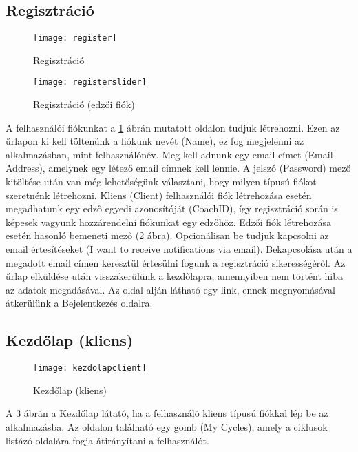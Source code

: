 \subsection{Regisztráció}

\begin{figure}[H]
	\centering
	\texttt{[image: register]}
	\caption{Regisztráció}
	\label{fig:register}
\end{figure}

\begin{figure}[H]
	\centering
	\texttt{[image: registerslider]}
	\caption{Regisztráció (edzői fiók)}
	\label{fig:registerslider}
\end{figure}

A felhasználói fiókunkat a \ref{fig:register} ábrán mutatott oldalon tudjuk létrehozni. Ezen az űrlapon ki kell töltenünk a fiókunk nevét (Name), ez fog megjelenni az alkalmazásban, mint felhasználónév. Meg kell adnunk egy email címet (Email Address), amelynek egy létező email címnek kell lennie. A jelszó (Password) mező kitöltése után van még lehetőségünk választani, hogy milyen típusú fiókot szeretnénk létrehozni. Kliens (Client) felhasználói fiók létrehozása esetén megadhatunk egy edző egyedi azonosítóját (CoachID), így regisztráció során is képesek vagyunk hozzárendelni fiókunkat egy edzőhöz. Edzői fiók létrehozása esetén hasonló bemeneti mező (\ref{fig:registerslider} ábra). Opcionálisan be tudjuk kapcsolni az email értesítéseket (I want to receive notifications via email). Bekapcsolása után a megadott email címen keresztül értesülni fogunk a regisztráció sikerességéről. Az űrlap elküldése után visszakerülünk a kezdőlapra, amennyiben nem történt hiba az adatok megadásával. Az oldal alján látható egy link, ennek megnyomásával átkerülünk a Bejelentkezés oldalra.

\subsection{Kezdőlap (kliens)}

\begin{figure}[H]
	\centering
	\texttt{[image: kezdolapclient]}
	\caption{Kezdőlap (kliens)}
	\label{fig:kezdolapclient}
\end{figure}

A \ref{fig:kezdolapclient} ábrán a Kezdőlap látató, ha a felhasználó kliens típusú fiókkal lép be az alkalmazásba. Az oldalon található egy gomb (My Cycles), amely a ciklusok listázó oldalára fogja átirányítani a felhasználót.

